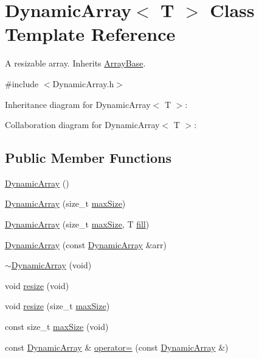 \hypertarget{classDynamicArray}{\section{Dynamic\+Array$<$ T $>$ Class Template Reference}
\label{classDynamicArray}
}


A resizable array. Inherits \hyperlink{classArrayBase}{Array\+Base}.  




{\ttfamily \#include $<$Dynamic\+Array.\+h$>$}



Inheritance diagram for Dynamic\+Array$<$ T $>$\+:


Collaboration diagram for Dynamic\+Array$<$ T $>$\+:
\subsection*{Public Member Functions}
\begin{DoxyCompactItemize}
\item 
\hyperlink{classDynamicArray_a7d42e6eaa66bab7c43f193e78d2d56a9}{Dynamic\+Array} ()
\item 
\hyperlink{classDynamicArray_a2b4e0e5f2d4af1b1ec5e37bcf2b63e27}{Dynamic\+Array} (size\+\_\+t \hyperlink{classDynamicArray_aeb1916d4d9cf7db37df86cb7a603c198}{max\+Size})
\item 
\hyperlink{classDynamicArray_ad054824baa39e43dd319dad7edff0316}{Dynamic\+Array} (size\+\_\+t \hyperlink{classDynamicArray_aeb1916d4d9cf7db37df86cb7a603c198}{max\+Size}, T \hyperlink{classArrayBase_a6becc5e91c79d7693c0d406e466f9ec6}{fill})
\item 
\hyperlink{classDynamicArray_ae6f8273691c6c3a9284e7455e6bea18d}{Dynamic\+Array} (const \hyperlink{classDynamicArray}{Dynamic\+Array} \&arr)
\item 
\hyperlink{classDynamicArray_a1ace6a2b9a5ed8890a840c400f41ce9a}{$\sim$\+Dynamic\+Array} (void)
\item 
void \hyperlink{classDynamicArray_a7d9f29d3efa102b7d8229bfc24b9d431}{resize} (void)
\item 
void \hyperlink{classDynamicArray_aee346fa4cd0db8d1f385ea82aa93f541}{resize} (size\+\_\+t \hyperlink{classDynamicArray_aeb1916d4d9cf7db37df86cb7a603c198}{max\+Size})
\item 
const size\+\_\+t \hyperlink{classDynamicArray_aeb1916d4d9cf7db37df86cb7a603c198}{max\+Size} (void)
\item 
const \hyperlink{classDynamicArray}{Dynamic\+Array} \& \hyperlink{classDynamicArray_a683eba7c0e4652c6b1baae93e1e6ca7b}{operator=} (const \hyperlink{classDynamicArray}{Dynamic\+Array} \&)
\end{DoxyCompactItemize}
